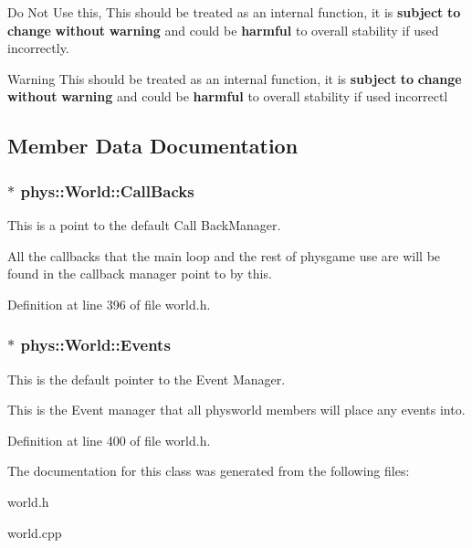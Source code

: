 Do Not Use this, This should be treated as an internal function, it is {\bfseries subject} {\bfseries to} {\bfseries change} {\bfseries without} {\bfseries warning} and could be {\bfseries harmful} to overall stability if used incorrectly. 

\begin{DoxyWarning}{Warning}
This should be treated as an internal function, it is {\bfseries subject} {\bfseries to} {\bfseries change} {\bfseries without} {\bfseries warning} and could be {\bfseries harmful} to overall stability if used incorrectl 
\end{DoxyWarning}


\subsection{Member Data Documentation}
\hypertarget{classphys_1_1World_a22a1624c63198f49fdf8e448881bdb2e}{
\subsubsection[{CallBacks}]{$\ast$ {\bf phys::World::CallBacks}}}
\label{da/ddf/classphys_1_1World_a22a1624c63198f49fdf8e448881bdb2e}


This is a point to the default Call BackManager. 

All the callbacks that the main loop and the rest of physgame use are will be found in the callback manager point to by this. 

Definition at line 396 of file world.h.

\hypertarget{classphys_1_1World_ad0b13f1f3caf0342f56671b522543453}{
\subsubsection[{Events}]{$\ast$ {\bf phys::World::Events}}}
\label{da/ddf/classphys_1_1World_ad0b13f1f3caf0342f56671b522543453}


This is the default pointer to the Event Manager. 

This is the Event manager that all physworld members will place any events into. 

Definition at line 400 of file world.h.



The documentation for this class was generated from the following files:\begin{DoxyCompactItemize}
\item 
world.h\item 
world.cpp\end{DoxyCompactItemize}
